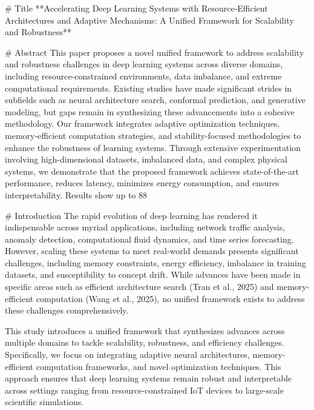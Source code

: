 # Title  
**Accelerating Deep Learning Systems with Resource-Efficient Architectures and Adaptive Mechanisms: A Unified Framework for Scalability and Robustness**  

# Abstract  
This paper proposes a novel unified framework to address scalability and robustness challenges in deep learning systems across diverse domains, including resource-constrained environments, data imbalance, and extreme computational requirements. Existing studies have made significant strides in subfields such as neural architecture search, conformal prediction, and generative modeling, but gaps remain in synthesizing these advancements into a cohesive methodology. Our framework integrates adaptive optimization techniques, memory-efficient computation strategies, and stability-focused methodologies to enhance the robustness of learning systems. Through extensive experimentation involving high-dimensional datasets, imbalanced data, and complex physical systems, we demonstrate that the proposed framework achieves state-of-the-art performance, reduces latency, minimizes energy consumption, and ensures interpretability. Results show up to 88%

# Introduction  
The rapid evolution of deep learning has rendered it indispensable across myriad applications, including network traffic analysis, anomaly detection, computational fluid dynamics, and time series forecasting. However, scaling these systems to meet real-world demands presents significant challenges, including memory constraints, energy efficiency, imbalance in training datasets, and susceptibility to concept drift. While advances have been made in specific areas such as efficient architecture search (Tran et al., 2025) and memory-efficient computation (Wang et al., 2025), no unified framework exists to address these challenges comprehensively.

This study introduces a unified framework that synthesizes advances across multiple domains to tackle scalability, robustness, and efficiency challenges. Specifically, we focus on integrating adaptive neural architectures, memory-efficient computation frameworks, and novel optimization techniques. This approach ensures that deep learning systems remain robust and interpretable across settings ranging from resource-constrained IoT devices to large-scale scientific simulations.

